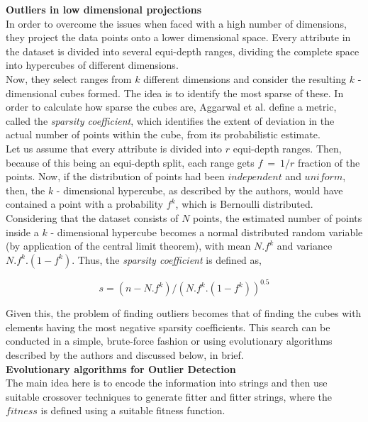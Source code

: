\noindent \textbf{Outliers in low dimensional projections} \\

In order to overcome the issues when faced with a high number of dimensions, they project the data points onto a lower dimensional space. Every attribute in the dataset is divided into several equi-depth ranges, dividing the complete space into hypercubes of different dimensions. \\ 

Now, they select ranges from $k$ different dimensions and consider the resulting $k$ - dimensional cubes formed. The idea is to identify the most sparse of these. In order to calculate how sparse the cubes are, Aggarwal et al. define a metric, called the \textit{sparsity coefficient}, which identifies the extent of deviation in the actual number of points within the cube, from its probabilistic estimate. \\

Let us assume that every attribute is divided into $r$ equi-depth ranges. Then, because of this being an equi-depth split, each range gets $f\ =\ 1/r$ fraction of the points. Now, if the distribution of points had been $independent$ and $uniform$, then, the $k$ - dimensional hypercube, as described by the authors, would have contained a point with a probability $f^k$, which is Bernoulli distributed. \\

Considering that the dataset consists of $N$ points, the estimated number of points inside a $k$ - dimensional hypercube becomes a normal distributed random variable (by application of the central limit theorem), with  mean $N.f^k$ and variance $N.f^k.(1-f^k)$. Thus, the \textit{sparsity coefficient} is defined as,

$$s = (n - N.f^k)/(N.f^k.(1-f^k))^{0.5}$$

Given this, the problem of finding outliers becomes that of finding the cubes with elements having the most negative sparsity coefficients. This search can be conducted in a simple, brute-force fashion or using evolutionary algorithms described by the authors and discussed below, in brief. \\

\noindent \textbf{Evolutionary algorithms for Outlier Detection} \\

The main idea here is to encode the information into strings and then use suitable crossover techniques to generate fitter and fitter strings, where the $fitness$ is defined using a suitable fitness function. \\

